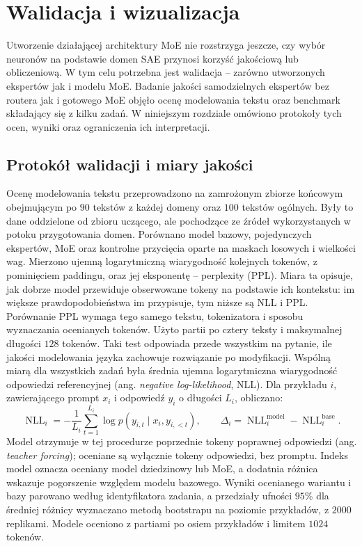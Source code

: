 \chapter{Walidacja i wizualizacja}
\label{chap:walidacja}
Utworzenie działającej architektury MoE nie rozstrzyga jeszcze, czy wybór neuronów na podstawie domen SAE przynosi korzyść jakościową lub obliczeniową. W tym celu potrzebna jest walidacja -- zarówno utworzonych ekspertów jak i modelu MoE. Badanie jakości samodzielnych ekspertów bez routera jak i gotowego MoE objęło ocenę modelowania tekstu oraz benchmark składający się z kilku zadań. W niniejszym rozdziale omówiono protokoły tych ocen, wyniki oraz ograniczenia ich interpretacji.

\section{Protokół walidacji i miary jakości}
\label{sec:protokol_walidacji}
Ocenę modelowania tekstu przeprowadzono na zamrożonym zbiorze końcowym obejmującym po $90$ tekstów z każdej domeny oraz $100$ tekstów ogólnych. Były to dane oddzielone od zbioru uczącego, ale pochodzące ze źródeł wykorzystanych w potoku przygotowania domen. Porównano model bazowy, pojedynczych ekspertów, MoE oraz kontrolne przycięcia oparte na maskach losowych i wielkości wag. Mierzono ujemną logarytmiczną wiarygodność kolejnych tokenów, z pominięciem paddingu, oraz jej eksponentę -- perplexity (PPL). Miara ta opisuje, jak dobrze model przewiduje obserwowane tokeny na podstawie ich kontekstu: im większe prawdopodobieństwa im przypisuje, tym niższe są NLL i PPL. Porównanie PPL wymaga tego samego tekstu, tokenizatora i sposobu wyznaczania ocenianych tokenów. Użyto partii po cztery teksty i maksymalnej długości $128$ tokenów. Taki test odpowiada przede wszystkim na pytanie, ile jakości modelowania języka zachowuje rozwiązanie po modyfikacji. \newline
Wspólną miarą dla wszystkich zadań była średnia ujemna logarytmiczna wiarygodność odpowiedzi referencyjnej (ang. \textit{negative log-likelihood}, NLL). Dla przykładu $i$, zawierającego prompt $x_i$ i odpowiedź $y_i$ o długości $L_i$, obliczano:
\[
\operatorname{NLL}_i=-\frac{1}{L_i}\sum_{t=1}^{L_i}
\log p(y_{i,t}\mid x_i,y_{i,<t}),
\qquad
\Delta_i=\operatorname{NLL}_i^{\mathrm{model}}-\operatorname{NLL}_i^{\mathrm{base}}.
\]
Model otrzymuje w tej procedurze poprzednie tokeny poprawnej odpowiedzi (ang. \textit{teacher forcing}); oceniane są wyłącznie tokeny odpowiedzi, bez promptu. Indeks $\mathrm{model}$ oznacza oceniany model dziedzinowy lub MoE, a dodatnia różnica wskazuje pogorszenie względem modelu bazowego. Wyniki ocenianego wariantu i bazy parowano według identyfikatora zadania, a przedziały ufności $95\%$ dla średniej różnicy wyznaczano metodą bootstrapu na poziomie przykładów, z $2000$ replikami. Modele oceniono z partiami po osiem przykładów i limitem $1024$ tokenów.

